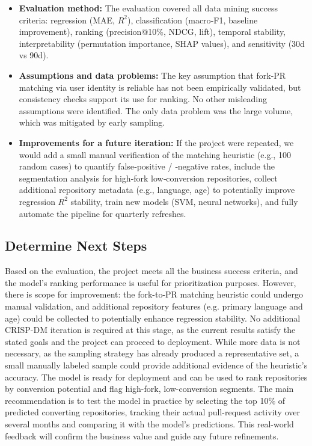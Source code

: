 \begin{itemize}
    \item \textbf{Evaluation method:} The evaluation covered all data mining success criteria: regression (MAE, $R^2$), classification (macro‑F1, baseline improvement), ranking (precision@10\%, NDCG, lift), temporal stability, interpretability (permutation importance, SHAP values), and sensitivity (30d vs 90d).

    \item \textbf{Assumptions and data problems:} The key assumption that fork‑PR matching via user identity is reliable has not been empirically validated, but consistency checks support its use for ranking. No other misleading assumptions were identified. The only data problem was the large volume, which was mitigated by early sampling.

    \item \textbf{Improvements for a future iteration:} If the project were repeated, we would add a small manual verification of the matching heuristic (e.g., 100 random cases) to quantify false‑positive / ‑negative rates, include the segmentation analysis for high‑fork low‑conversion repositories, collect additional repository metadata (e.g., language, age) to potentially improve regression $R^2$ stability, train new models (SVM, neural networks), and fully automate the pipeline for quarterly refreshes.
\end{itemize}

\subsection{Determine Next Steps}

Based on the evaluation, the project meets all the business success criteria, and the model’s ranking performance is useful for prioritization purposes. However, there is scope for improvement: the fork-to-PR matching heuristic could undergo manual validation, and additional repository features (e.g. primary language and age) could be collected to potentially enhance regression stability. No additional CRISP-DM iteration is required at this stage, as the current results satisfy the stated goals and the project can proceed to deployment. While more data is not necessary, as the sampling strategy has already produced a representative set, a small manually labeled sample could provide additional evidence of the heuristic’s accuracy. The model is ready for deployment and can be used to rank repositories by conversion potential and flag high-fork, low-conversion segments. The main recommendation is to test the model in practice by selecting the top 10\% of predicted converting repositories, tracking their actual pull-request activity over several months and comparing it with the model’s predictions. This real-world feedback will confirm the business value and guide any future refinements.

